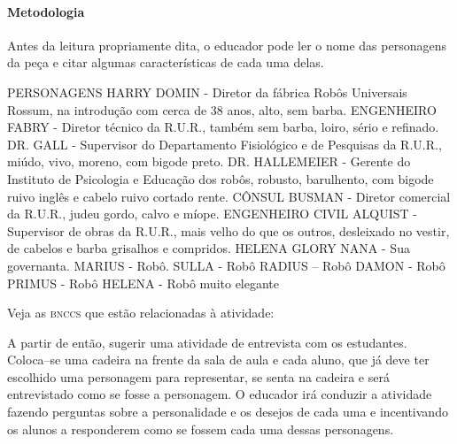 \documentclass[11pt]{extarticle}
\begin{document}

\paragraph{Metodologia} Antes da leitura propriamente dita, o educador pode ler o nome das personagens da peça e citar algumas características de cada uma delas.

PERSONAGENS 
HARRY DOMIN -  Diretor da fábrica Robôs Universais Rossum, na introdução com cerca de 38 anos, alto, sem barba.
 ENGENHEIRO FABRY -  Diretor técnico da R.U.R., também sem barba, loiro, sério e refinado. 
DR. GALL -  Supervisor do Departamento Fisiológico e de Pesquisas da R.U.R., miúdo, vivo, moreno, com bigode preto.
 DR. HALLEMEIER - Gerente do Instituto de Psicologia e Educação dos robôs, robusto, barulhento, com bigode ruivo inglês e cabelo ruivo cortado rente. 
CÔNSUL BUSMAN -  Diretor comercial da R.U.R., judeu gordo, calvo e míope. 
ENGENHEIRO CIVIL ALQUIST -  Supervisor de obras da R.U.R., mais velho do que os outros, desleixado no vestir, de cabelos e barba grisalhos e compridos. 
HELENA GLORY 
NANA - Sua governanta. 
MARIUS - Robô.
SULLA -  Robô
RADIUS – Robô
DAMON - Robô
PRIMUS - Robô
HELENA - Robô muito elegante

Veja as \textsc{bnccs} que estão relacionadas à atividade:


A partir de então, sugerir uma atividade de entrevista com os estudantes. Coloca–se uma cadeira na frente da sala de aula e cada aluno, que já deve ter escolhido uma personagem para representar, se senta na cadeira e será entrevistado como se fosse a personagem. O educador irá conduzir a atividade fazendo perguntas sobre a personalidade e os desejos de cada uma e incentivando os alunos a responderem como se fossem cada uma dessas personagens.
\end{document}
